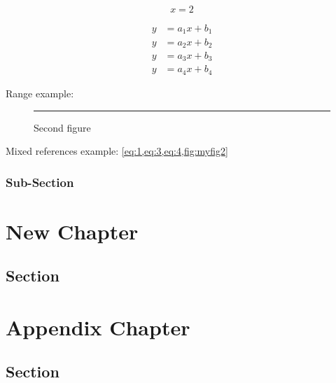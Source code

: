 \documentclass[12pt]{book}
\begin{document}
\begin{equation}
x = 2
\end{equation}

\blindtext
\blindtext
\begin{align}
  y&=a_1x+b_1\label{eq:1}\\
  y&=a_2x+b_2\label{eq:2}\\
  y&=a_3x+b_3\label{eq:3}\\
  y&=a_4x+b_4\label{eq:4}
\end{align}

\noindent
Range example: 
 
\begin{figure}[ht]
  \centering
  \rule{0.5\linewidth}{0.1\linewidth}
  \caption{Second figure}
  \label{fig:myfig2}
\end{figure}
 
\noindent
Mixed references example: \cref{eq:1,eq:3,eq:4,fig:myfig2}
 

\subsection{Sub-Section}

\chapter{New Chapter}

\section{Section}


\appendix

\chapter{Appendix Chapter}

\section{Section}
\end{document}
